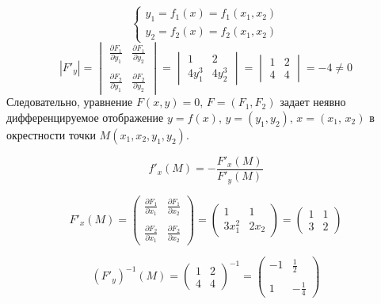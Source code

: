 \documentclass[a5paper, 10pt]{article}
\theoremstyle{definition}
\theoremstyle{plain}
\theoremstyle{remark}
\begin{document}
\begin{equation}
\begin{cases}
y_1 = f_1 (x) = f_1 (x_1, x_2)\\
y_2 = f_2 (x) = f_2 (x_1, x_2)
\end{cases}
\end{equation}
\begin{equation}
|F'_y| = 
\begin{vmatrix} 
\frac{\partial F_1}{\partial y_1} & \frac{\partial F_1}{\partial y_2}\\
\\
\frac{\partial F_2}{\partial y_1} & \frac{\partial F_2}{\partial y_2}
\end{vmatrix}
=
\begin{vmatrix} 
1 & 2 \\
4y_1^3 & 4y_2^3
\end{vmatrix}
=
\begin{vmatrix} 
1 & 2 \\
4 & 4
\end{vmatrix}
=-4 \neq 0
\end{equation}
Следовательно,  уравнение $F(x,y)=0, \, F=(F_1, F_2)$ задает неявно дифференцируемое отображение $y=f(x), \, y=(y_1, y_2), \, x = (x_1, \, x_2)$ в окрестности точки $M(x_1, x_2, y_1, y_2)$.

\begin{equation}
f'_x (M) = - \frac{F'_x (M)}{F'_y (M)}
\end{equation}

\begin{equation}
F'_x (M)= 
\begin{pmatrix} 
\frac{\partial F_1}{\partial x_1} & \frac{\partial F_1}{\partial x_2}\\
\\
\frac{\partial F_2}{\partial x_1} & \frac{\partial F_2}{\partial x_2}
\end{pmatrix}
=
\begin{pmatrix} 
1 & 1 \\
3x_1^2 & 2x_2
\end{pmatrix}
=
\begin{pmatrix} 
1 & 1 \\
3 & 2
\end{pmatrix}
\end{equation}


\begin{equation}
(F'_y)^{-1} (M) = 
\begin{pmatrix} 
1 & 2 \\
4 & 4
\end{pmatrix}^{-1}
=
\begin{pmatrix} 
-1 & \frac{1}{2} \\
\\
1 & - \frac{1}{4}
\end{pmatrix}
\end{equation}
\end{document}
